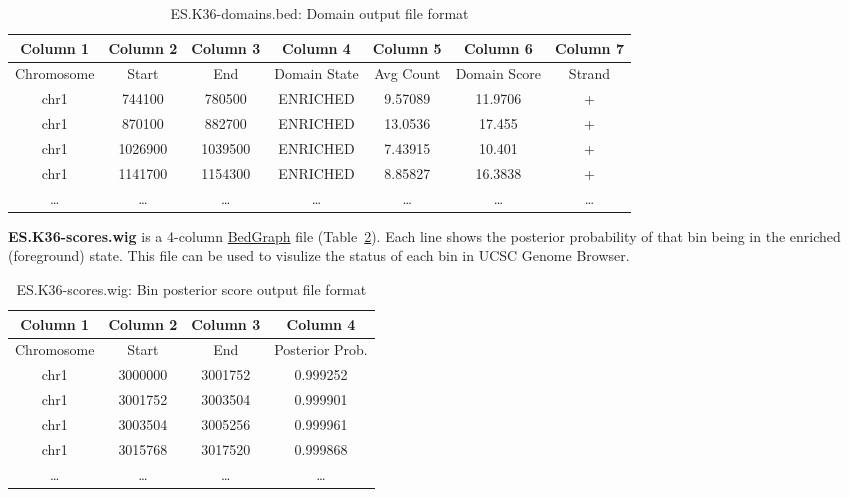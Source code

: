 \documentclass[11pt]{report}
\begin{document}
\begin{table}[th]
  \centering
  \begin{tabular}{c c c c c c c}
Column 1 & Column 2 & Column 3 &  Column 4 & Column 5 &  Column 6  &
Column 7 \\
\hline
Chromosome  & Start & End & Domain State &  Avg Count & Domain Score &  Strand \\
\hline
chr1 &   744100  &780500  &ENRICHED        &9.57089 &11.9706 &+ \\
chr1 &   870100  &882700  &ENRICHED        &13.0536 &17.455  &+ \\
chr1 &   1026900 &1039500 &ENRICHED        &7.43915 &10.401  &+ \\
chr1 &   1141700 &1154300 &ENRICHED        &8.85827 &16.3838 &+ \\
\ldots & \ldots &\ldots &\ldots &\ldots &\ldots & \ldots\\ 
\hline
  \end{tabular}
  \caption{ES.K36-domains.bed: Domain output file format}
  \label{tab:format-domain}
\end{table}

\textbf{ES.K36-scores.wig} is a 4-column
\href{http://genome.ucsc.edu/goldenPath/help/bedgraph.html}{BedGraph}
file (Table~\ref{tab:format-bin-score}). Each line shows the posterior
probability of that bin being in the enriched (foreground) state. This
file can be used to visulize the status of each bin in UCSC Genome
Browser.

\begin{table}[th]
  \centering
  \begin{tabular}{c c c c}
Column 1 & Column 2 & Column 3 &  Column 4  \\
\hline
Chromosome  & Start & End & Posterior Prob. \\
\hline
chr1&    3000000& 3001752& 0.999252\\
chr1&    3001752& 3003504& 0.999901\\
chr1&    3003504& 3005256& 0.999961\\
chr1&    3015768& 3017520& 0.999868\\
\ldots & \ldots &\ldots &\ldots \\ 
\hline
  \end{tabular}
  \caption{ES.K36-scores.wig: Bin posterior score  output file format}
  \label{tab:format-bin-score}
\end{table}
\end{document}
